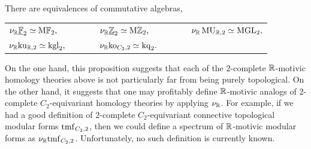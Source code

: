 \begin{prop}
  There are equivalences of commutative algebras,
  \begin{center}
  \begin{tabular}{lll}
    $ \nu_{\mathbb{R}} \underline{\mathbb{F}}_2 \simeq \mathrm{M}\mathbb{F}_2,  \qquad\qquad$ &
    $ \nu_{\mathbb{R}} \underline{\mathbb{Z}}_{2} \simeq \mathrm{M}\mathbb{Z}_{2}, \qquad\qquad$ &    
    $ \nu_{\mathbb{R}} \operatorname{\mathrm{MU}}_{\mathbb{R},2} \simeq \mathrm{MGL}_2, $ \\
    $ \nu_{\mathbb{R}} \mathrm{ku}_{\mathbb{R},2} \simeq \mathrm{kgl}_2, $ &
    $ \nu_{\mathbb{R}} \mathrm{ko}_{C_2,2} \simeq \mathrm{kq}_2.$
  \end{tabular}
  \end{center}
\end{prop}

On the one hand, this proposition suggests that each of the $2$-complete $\mathbb{R}$-motivic homology theories above is not particularly far from being purely topological.
On the other hand, it suggests that one may profitably define $\mathbb{R}$-motivic analogs of $2$-complete $C_2$-equivariant homology theories by applying $\nu_{\mathbb{R}}$.
For example, if we had a good definition of $2$-complete $C_2$-equivariant connective topological modular forms $\mathrm{tmf}_{C_2, 2}$, then we could define a spectrum of $\mathbb{R}$-motivic modular forms as $\nu_{\mathbb{R}} \mathrm{tmf}_{C_2, 2}$. Unfortunately, no such definition is currently known.
%
%
%
%
%










